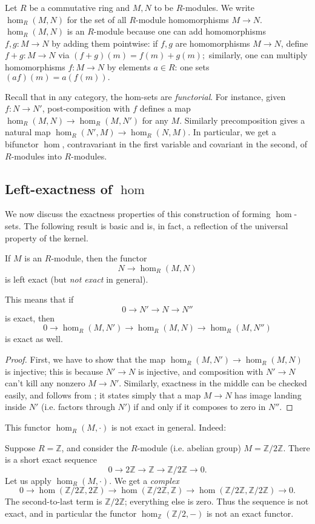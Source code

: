 \begin{definition}
Let $R$ be a commutative ring and $M,N$ to be $R$-modules.  We write
$\hom_R(M,N)$ for
the set of all $R$-module homomorphisms $M \to N$.
 $\hom_R(M,N)$ is an $R$-module because one can add homomorphisms $f,g: M
\to N$ by adding
them pointwise: if $f,g$ are homomorphisms $M \to N$, define $f+g: M \to N$ via
\( (f+g)(m) = f(m)+g(m);  \)
similarly, one can multiply homomorphisms $f: M \to N$ by elements  $ a \in
R$: one sets
\( (af)(m) = a(f(m)).  \)
\end{definition}

Recall that in any category, the hom-sets are \emph{functorial}. For instance,
given $f: N \to N'$, post-composition with $f$ defines a map $\hom_R(M,N) \to
\hom_R(M,N')$ for any $M$.
Similarly precomposition gives  a natural map $\hom_R(N', M) \to \hom_R(N, M)$.
In particular, we get a bifunctor $\hom$, contravariant in the first variable
and covariant in the second, of $R$-modules into $R$-modules.

\subsection{Left-exactness of $\hom$}

We now discuss the exactness properties of this construction of forming
$\hom$-sets. The following result is basic and is, in fact, a reflection of
the universal property of the kernel.
\begin{proposition} \label{homcovleftexact}
If $M$ is an $R$-module, then the functor
\[ N \to \hom_R(M,N)  \]
is left exact (but \emph{not exact} in general).
\end{proposition}
This means that if
\[ 0 \to N' \to N \to N''  \]
is exact,
then
\[ 0 \to \hom_R(M, N') \to \hom_R(M, N) \to \hom_R(M, N'')  \]
is exact as well.

\begin{proof}
 First, we have to show that the map
$\hom_R(M,N') \to \hom_R(M,N)$ is injective; this is because $N' \to N$ is
injective, and composition with $N' \to N$ can't kill any nonzero $M \to N'$.
Similarly, exactness in the middle can be checked easily, and follows from
; it states simply that a map $M \to N$ has
image landing inside $N'$ (i.e. factors through $N'$) if and only if it
composes to zero in $N''$.
\end{proof}

\newcommand{\ol}[1]{\mathbf{#1}}
This functor $\hom_R(M, \cdot)$  is not exact in general.  Indeed:
\begin{example}
Suppose $R = \mathbb{Z}$, and consider the $R$-module (i.e. abelian group)
$M = \mathbb{Z}/2\mathbb{Z}$. There is a short exact
sequence
\[ 0 \to 2\mathbb{Z} \to \mathbb{Z} \to \mathbb{Z}/2\mathbb{Z} \to 0.  \]
Let us apply $\hom_R(M, \cdot)$. We get a \emph{complex}
\[ 0 \to \hom(\mathbb{Z}/2\mathbb{Z}, 2\mathbb{Z}) \to
\hom(\mathbb{Z}/2\mathbb{Z}, \mathbb{Z}) \to \hom(\mathbb{Z}/2\mathbb{Z},
\mathbb{Z}/2\mathbb{Z}) \to 0.  \]
The second-to-last term is $\mathbb{Z}/2\mathbb{Z}$; everything else is
zero. Thus the sequence is not exact, and in particular the functor
$\hom_{\mathbb{Z}}(\mathbb{Z}/2, -)$ is not an exact functor.
\end{example}


